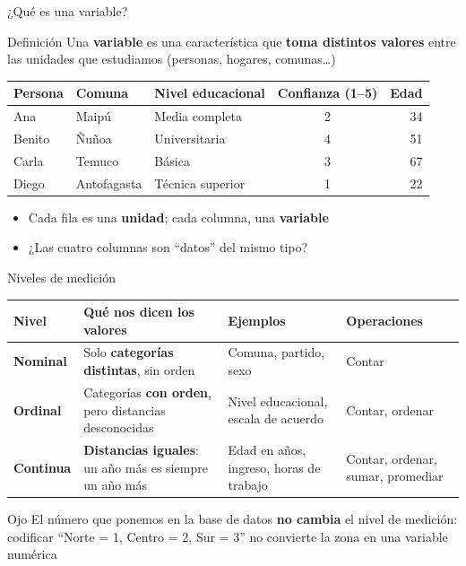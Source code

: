 \documentclass[aspectratio=169,11pt]{beamer}
\newcommand{\hl}[1]{\textcolor{marino}{\textbf{#1}}}        %
\renewcommand{\arraystretch}{1.5}
\begin{document}
\begin{frame}{¿Qué es una variable?}
\begin{block}{Definición}
\small
Una \hl{variable} es una característica que \textbf{toma distintos valores} entre las unidades que estudiamos (personas, hogares, comunas\ldots)
\end{block}
\bigskip
\begin{center}
\small
\begin{tabular}{lllcr}
\toprule
\textbf{Persona} & \textbf{Comuna} & \textbf{Nivel educacional} & \textbf{Confianza (1--5)} & \textbf{Edad} \\
\midrule
\rowcolor{crema}
Ana    & Maipú        & Media completa   & 2 & 34 \\
Benito & Ñuñoa        & Universitaria    & 4 & 51 \\
\rowcolor{crema}
Carla  & Temuco       & Básica           & 3 & 67 \\
Diego  & Antofagasta  & Técnica superior & 1 & 22 \\
\bottomrule
\end{tabular}
\end{center}
\bigskip
\begin{itemize}
  \item Cada fila es una \textbf{unidad}; cada columna, una \textbf{variable}
  \item ¿Las cuatro columnas son ``datos'' del mismo tipo?
\end{itemize}
\end{frame}

\begin{frame}{Niveles de medición}
\begin{center}
\small
\renewcommand{\arraystretch}{1.6}
\begin{tabular}{>{\raggedright}p{}>{\raggedright}p{}>{\raggedright}p{}p{}}
\toprule
\textbf{Nivel} & \textbf{Qué nos dicen los valores} & \textbf{Ejemplos} & \textbf{Operaciones} \\
\midrule
\rowcolor{crema}
\textbf{Nominal} & Solo \textbf{categorías distintas}, sin orden & Comuna, partido, sexo & Contar \\
\textbf{Ordinal} & Categorías \textbf{con orden}, pero distancias desconocidas & Nivel educacional, escala de acuerdo & Contar, ordenar \\
\rowcolor{crema}
\textbf{Continua} & \textbf{Distancias iguales}: un año más es siempre un año más & Edad en años, ingreso, horas de trabajo & Contar, ordenar, sumar, promediar \\
\bottomrule
\end{tabular}
\end{center}
\bigskip
\begin{alertblock}{Ojo}
\small
El número que ponemos en la base de datos \textbf{no cambia} el nivel de medición: codificar ``Norte = 1, Centro = 2, Sur = 3'' no convierte la zona en una variable numérica
\end{alertblock}
\end{frame}
\end{document}
